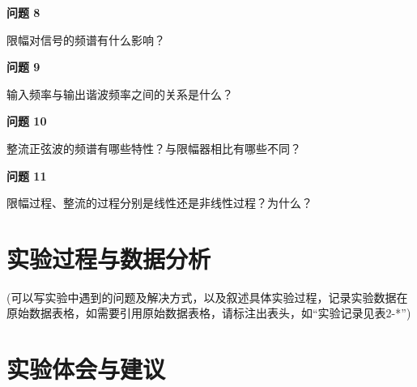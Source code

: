 \documentclass{sasreport}
\begin{document}
\textbf{问题 8}

限幅对信号的频谱有什么影响？

\textbf{问题 9}

输入频率与输出谐波频率之间的关系是什么？

\textbf{问题 10}

整流正弦波的频谱有哪些特性？与限幅器相比有哪些不同？

\textbf{问题 11}

限幅过程、整流的过程分别是线性还是非线性过程？为什么？

\section{实验过程与数据分析}
 {\kaishu (可以写实验中遇到的问题及解决方式，以及叙述具体实验过程，记录实验数据在原始数据表格，如需要引用原始数据表格，请标注出表头，如“实验记录见表2-*”)}

\section{实验体会与建议}
\end{document}

